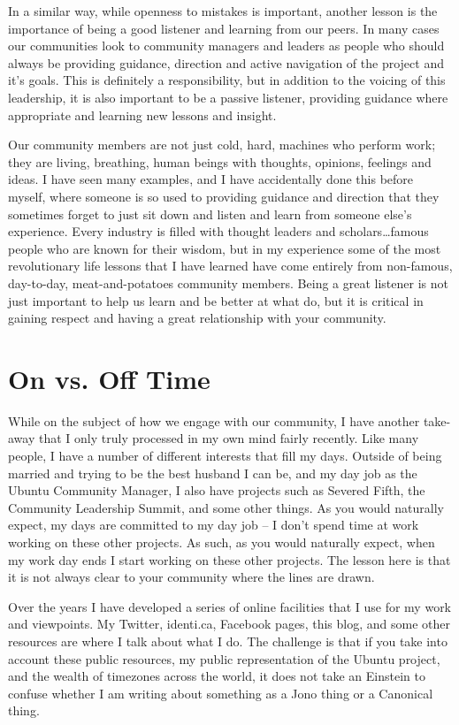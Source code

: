 In a similar way, while openness to mistakes is important, another lesson is the importance of being a good listener and learning from our peers. In many cases our communities look to community managers and leaders as people who should always be providing guidance, direction and active navigation of the project and it’s goals. This is definitely a responsibility, but in addition to the voicing of this leadership, it is also important to be a passive listener, providing guidance where appropriate and learning new lessons and insight.

Our community members are not just cold, hard, machines who perform work; they are living, breathing, human beings with thoughts, opinions, feelings and ideas. I have seen many examples, and I have accidentally done this before myself, where someone is so used to providing guidance and direction that they sometimes forget to just sit down and listen and learn from someone else’s experience. Every industry is filled with thought leaders and scholars…famous people who are known for their wisdom, but in my experience some of the most revolutionary life lessons that I have learned have come entirely from non-famous, day-to-day, meat-and-potatoes community members. Being a great listener is not just important to help us learn and be better at what do, but it is critical in gaining respect and having a great relationship with your community.

\section*{On vs. Off Time}

While on the subject of how we engage with our community, I have another take-away that I only truly processed in my own mind fairly recently. Like many people, I have a number of different interests that fill my days. Outside of being married and trying to be the best husband I can be, and my day job as the Ubuntu Community Manager, I also have projects such as Severed Fifth, the Community Leadership Summit, and some other things. As you would naturally expect, my days are committed to my day job – I don’t spend time at work working on these other projects. As such, as you would naturally expect, when my work day ends I start working on these other projects. The lesson here is that it is not always clear to your community where the lines are drawn.

Over the years I have developed a series of online facilities that I use for my work and viewpoints. My Twitter, identi.ca, Facebook pages, this blog, and some other resources are where I talk about what I do. The challenge is that if you take into account these public resources, my public representation of the Ubuntu project, and the wealth of timezones across the world, it does not take an Einstein to confuse whether I am writing about something as a Jono thing or a Canonical thing.

